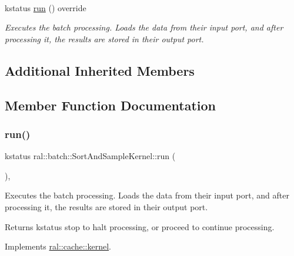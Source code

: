 \begin{DoxyCompactItemize}
$$\item 
kstatus \hyperlink{classral_1_1batch_1_1SortAndSampleKernel_a6e97bc1286a0e8d8273556d56372fa56}{run} () override
\begin{DoxyCompactList}\small\item\em Executes the batch processing. Loads the data from their input port, and after processing it, the results are stored in their output port. \end{DoxyCompactList}\end{DoxyCompactItemize}
\subsection*{Additional Inherited Members}


\subsection{Member Function Documentation}
\mbox{\label{classral_1_1batch_1_1SortAndSampleKernel_a6e97bc1286a0e8d8273556d56372fa56}} 
\subsubsection{\texorpdfstring{run()}{run()}}
{\footnotesize\ttfamily kstatus ral\+::batch\+::\+Sort\+And\+Sample\+Kernel\+::run (\begin{DoxyParamCaption}{ }\end{DoxyParamCaption})\hspace{0.3cm}{\ttfamily [override]}, {\ttfamily [virtual]}}



Executes the batch processing. Loads the data from their input port, and after processing it, the results are stored in their output port. 

\begin{DoxyReturn}{Returns}
kstatus \textquotesingle{}stop\textquotesingle{} to halt processing, or \textquotesingle{}proceed\textquotesingle{} to continue processing. 
\end{DoxyReturn}


Implements \hyperlink{classral_1_1cache_1_1kernel_a735b081cccae9574924e74ea6d293ef7}{ral\+::cache\+::kernel}.

